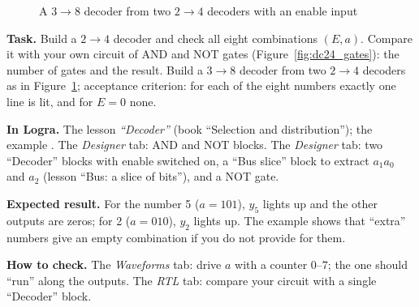 \begin{figure}[H]
\centering
{}
\caption{A $3\to8$ decoder from two $2\to4$ decoders with an enable input}
\label{fig:dc38}
\end{figure}

\begin{diybox}
\textbf{Task.}  Build a $2\to4$ decoder and check all
eight combinations $(E,a)$.  Compare it with your own circuit of
AND and NOT gates (Figure~\ref{fig:dc24_gates}): the number of gates and the
result.  Build a $3\to8$ decoder from two $2\to4$ decoders as in
Figure~\ref{fig:dc38}; acceptance criterion: for each of the eight numbers
exactly one line is lit, and for $E=0$ none.

\textbf{In Logra.}  The lesson \emph{``Decoder''} (book ``Selection and
distribution''); the example .  The \emph{Designer} tab:
AND and NOT blocks.  The \emph{Designer} tab: two ``Decoder'' blocks with
enable switched on, a ``Bus slice'' block to extract $a_1a_0$ and $a_2$
(lesson ``Bus: a slice of bits''), and a NOT gate.

\textbf{Expected result.} For the number 5 ($a=101$), $y_5$ lights up and
the other outputs are zeros; for 2 ($a=010$), $y_2$ lights up. The example
 shows that ``extra'' numbers give an empty
combination if you do not provide for them.

\textbf{How to check.} The \emph{Waveforms} tab: drive $a$ with a counter
$0$--$7$; the one should ``run'' along the outputs. The \emph{RTL} tab: compare
your circuit with a single ``Decoder'' block.
\end{diybox}

